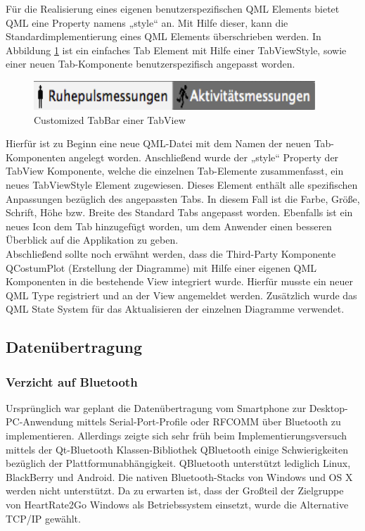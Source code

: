 Für die Realisierung eines eigenen benutzerspezifischen QML Elements bietet QML  eine Property namens „style“ an. Mit Hilfe dieser, kann die Standardimplementierung eines QML Elements überschrieben werden. In Abbildung \ref{pic:TabView} ist ein einfaches Tab Element mit Hilfe einer TabViewStyle, sowie einer neuen Tab-Komponente benutzerspezifisch angepasst worden.

\begin{figure}[H]
	\centering
	\includegraphics[scale=0.6]{images/TabView.png}
	\caption{Customized TabBar einer TabView}
	\label{pic:TabView}
\end{figure}

Hierfür ist zu Beginn eine neue QML-Datei mit dem Namen der neuen Tab-Komponenten angelegt worden. Anschließend wurde der „style“ Property der TabView Komponente, welche die einzelnen Tab-Elemente zusammenfasst, ein neues TabViewStyle Element zugewiesen. Dieses Element enthält alle spezifischen Anpassungen bezüglich des angepassten Tabs. In diesem Fall ist die Farbe, Größe, Schrift, Höhe bzw. Breite des Standard Tabs angepasst worden. Ebenfalls ist ein neues Icon dem Tab hinzugefügt worden, um dem Anwender einen besseren Überblick auf die Applikation zu geben. \\

Abschließend sollte noch erwähnt werden, dass die Third-Party Komponente QCostumPlot (Erstellung der Diagramme) mit Hilfe einer eigenen QML Komponenten in die bestehende View integriert wurde. Hierfür musste ein neuer QML Type registriert und an der View angemeldet werden. Zusätzlich wurde das QML State System für das Aktualisieren der einzelnen Diagramme verwendet.

\subsection{Datenübertragung}
\subsubsection{Verzicht auf Bluetooth}
Ursprünglich war geplant die Datenübertragung vom Smartphone zur Desktop-PC-Anwendung mittels Serial-Port-Profile oder RFCOMM über Bluetooth zu implementieren. Allerdings zeigte sich sehr früh beim Implementierungsversuch mittels der Qt-Bluetooth Klassen-Bibliothek QBluetooth einige Schwierigkeiten bezüglich der Plattformunabhängigkeit. QBluetooth unterstützt lediglich Linux, BlackBerry und Android\cite{qtbluetooth}. Die nativen Bluetooth-Stacks von Windows und OS X werden nicht unterstützt. Da zu erwarten ist, dass der Großteil der Zielgruppe von HeartRate2Go Windows als Betriebssystem einsetzt, wurde die Alternative TCP/IP gewählt.

